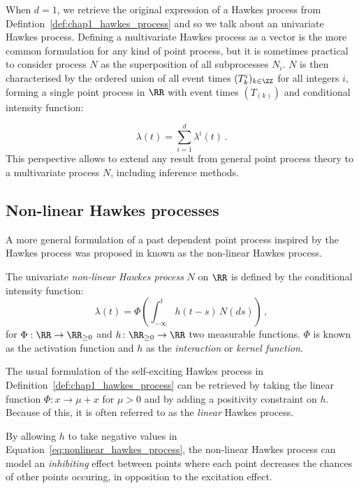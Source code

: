 When $d=1$, we retrieve the original expression of a Hawkes process from Defintion~\ref{def:chap1_hawkes_process} and so we talk about an univariate Hawkes process. 
Defining a multivariate Hawkes process as a vector is the more common formulation for any kind of point process, but it is sometimes practical to consider process $N$ as the superposition of all subprocesses $N_i$.
$N$ is then characterised by the ordered union of all event times $(T_k^i)_{k\in\ZZ}$ for all integers $i$, forming a single point process in $\RR$ with event times $(T_{(k)})$ and conditional intensity function:

\[\lambda(t) = \sum_{i=1}^{d}{\lambda^i(t)}\,.\]
This perspective allows to extend any result from general point process theory to a multivariate process $N$, including inference methods.

\subsection{Non-linear Hawkes processes}

A more general formulation of a past dependent point process inspired by the Hawkes process was proposed in \cite{Bremaud1996} known as the non-linear Hawkes process.

\begin{definition}
    The univariate \emph{non-linear Hawkes process} $N$ on $\RR$ is defined by the conditional intensity function:
    \begin{equation}\label{eq:nonlinear_hawkes_process}
        \lambda(t) = \Phi\left(\int_{-\infty}^{t}{h(t-s)\,N(ds)}\right)\,,
    \end{equation}
    for $\Phi:\RR \to \RR_{\geq 0}$ and $h\colon \RR_{\geq 0}\to \RR$ two measurable functions.
    $\Phi$ is known as the activation function and $h$ as the \emph{interaction} or \emph{kernel function}.
\end{definition}
The usual formulation of the self-exciting Hawkes process in Definition~\ref{def:chap1_hawkes_process} can be retrieved by taking the linear function $\Phi\colon x \to \mu + x$ for $\mu>0$ and by adding a positivity constraint on $h$. 
Because of this, it is often referred to as the \emph{linear} Hawkes process.

By allowing $h$ to take negative values in Equation~\eqref{eq:nonlinear_hawkes_process}, the non-linear Hawkes process can model an \emph{inhibiting} effect between points where each point decreases the chances of other points occuring, in opposition to the excitation effect.

